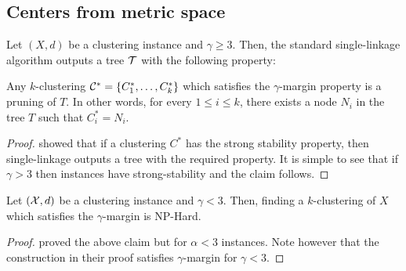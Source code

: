 \subsection{Centers from metric space}
\begin{theorem}
\label{thm:upperCenterMetric}
Let $(X , d)$ be a clustering instance and $\gamma \ge 3$. Then, the standard single-linkage algorithm outputs a tree $\mathcal T$ with the following property:


Any $k$-clustering $\mathcal C^* = \{C_1^*, \ldots, C_k^* \}$ which satisfies the $\gamma$-margin property is a pruning of $T$. In other words, for every $1 \le i \le k$, there exists a node $N_i$ in the tree $T$ such that $C_i^* = N_i$. 
\end{theorem}

\begin{proof}
\cite{balcan2008discriminative} showed that if a clustering $C^*$ has the strong stability property, then single-linkage outputs a tree with the required property. It is simple to see that if $\gamma > 3$ then instances have strong-stability and the claim follows.  
\end{proof}


\begin{theorem}
\label{thm:lowerCenterMetric}
Let $(\mathcal X, d)$ be a clustering instance and $\gamma < 3$. Then, finding a $k$-clustering of $X$ which satisfies the $\gamma$-margin is NP-Hard.
\end{theorem}
\begin{proof}
\cite{awasthi2012center} proved the above claim but for $\alpha < 3$ instances. Note however that the construction in their proof satisfies $\gamma$-margin for $\gamma < 3$. 
\end{proof}




